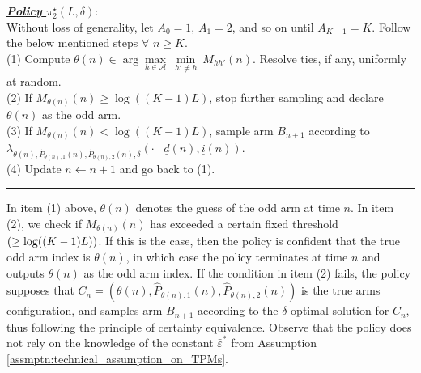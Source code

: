 \noindent \textbf{\underline{\emph{Policy }$\pi_2^{\star}(L,\delta)$}}:
\vspace{.1in}\\
\noindent Without loss of generality, let $A_0=1$, $A_1=2$, and so on until $A_{K-1}=K$. Follow the below mentioned steps $\forall$ $n\geq K$.\\
\noindent (1) Compute $\theta(n)\in \arg\max\limits_{h\in \mathcal{A}}~ \min\limits_{h'\neq h}~M_{hh'}(n).$ Resolve ties, if any, uniformly at random.\\
\noindent (2) If $M_{\theta(n)}(n) \geq \log((K-1)L)$, stop further sampling and declare $\theta(n)$ as the odd arm.\\
\noindent (3) If $M_{\theta(n)}(n) < \log((K-1)L)$, sample arm $B_{n+1}$ according to $\lambda_{\theta(n), \hat{P}_{\theta(n), 1}(n), \hat{P}_{\theta(n), 2}(n), \delta}(\cdot\mid \underline{d}(n), \underline{i}(n))$.\\
\noindent (4) Update $n\leftarrow n+1$ and go back to (1).
\vspace{.1in}
\hrule
\vspace{0.1in}
In item (1) above, $\theta(n)$ denotes the guess of the odd arm at time $n$. In item (2), we check if $M_{\theta(n)}(n)$ has exceeded a certain fixed threshold $ ({\color{black} \geq\log((K-1)L)})$. If this is the case, then the policy is confident that the true odd arm index is $\theta(n)$, in which case the policy terminates at time $n$ and outputs $\theta(n)$ as the odd arm index. If the condition in item (2) fails, the policy supposes that $C_n=(\theta(n), \hat{P}_{\theta(n), 1}(n), \hat{P}_{\theta(n), 2}(n))$ is the true arms configuration, and samples arm $B_{n+1}$ according to the $\delta$-optimal solution for $C_n$, thus following the principle of certainty equivalence. Observe that the policy does not rely on the knowledge of the constant $\bar{\varepsilon}^*$ from Assumption \ref{assmptn:technical_assumption_on_TPMs}.

